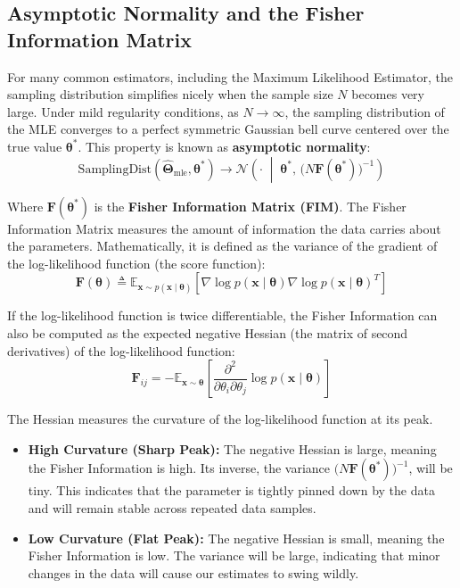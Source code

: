 \documentclass{article}
\begin{document}
\subsection{Asymptotic Normality and the Fisher Information Matrix}
For many common estimators, including the Maximum Likelihood Estimator, the sampling distribution simplifies nicely when the sample size $N$ becomes very large. Under mild regularity conditions, as $N \to \infty$, the sampling distribution of the MLE converges to a perfect symmetric Gaussian bell curve centered over the true value $\boldsymbol{\theta}^*$. This property is known as \textbf{asymptotic normality}:
\begin{equation}
\text{SamplingDist}(\hat{\boldsymbol{\Theta}}_{\text{mle}}, \boldsymbol{\theta}^*) \to \mathcal{N}\left(\cdot \;\middle|\; \boldsymbol{\theta}^*, \, \big(N \mathbf{F}(\boldsymbol{\theta}^*)\big)^{-1}\right)
\end{equation}

Where $\mathbf{F}(\boldsymbol{\theta}^*)$ is the \textbf{Fisher Information Matrix (FIM)}. The Fisher Information Matrix measures the amount of information the data carries about the parameters. Mathematically, it is defined as the variance of the gradient of the log-likelihood function (the score function):
\begin{equation}
\mathbf{F}(\boldsymbol{\theta}) \triangleq \mathbb{E}_{\mathbf{x} \sim p(\mathbf{x} \mid \boldsymbol{\theta})} \left[ \nabla \log p(\mathbf{x} \mid \boldsymbol{\theta}) \nabla \log p(\mathbf{x} \mid \boldsymbol{\theta})^T \right]
\end{equation}

If the log-likelihood function is twice differentiable, the Fisher Information can also be computed as the expected negative Hessian (the matrix of second derivatives) of the log-likelihood function:
\begin{equation}
\mathbf{F}_{ij} = -\mathbb{E}_{\mathbf{x} \sim \boldsymbol{\theta}} \left[ \frac{\partial^2}{\partial \theta_i \partial \theta_j} \log p(\mathbf{x} \mid \boldsymbol{\theta}) \right]
\end{equation}

The Hessian measures the curvature of the log-likelihood function at its peak. 
\begin{itemize}
    \item \textbf{High Curvature (Sharp Peak):} The negative Hessian is large, meaning the Fisher Information is high. Its inverse, the variance $\big(N\mathbf{F}(\boldsymbol{\theta}^*)\big)^{-1}$, will be tiny. This indicates that the parameter is tightly pinned down by the data and will remain stable across repeated data samples.
    \item \textbf{Low Curvature (Flat Peak):} The negative Hessian is small, meaning the Fisher Information is low. The variance will be large, indicating that minor changes in the data will cause our estimates to swing wildly.
\end{itemize}
\end{document}
